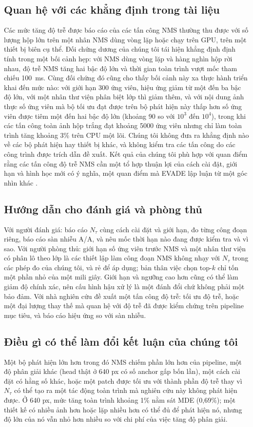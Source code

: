 \documentclass[a4paper,fleqn]{cas-dc}
\newcommand{\Ntau}{N_{\tau}}
\begin{document}
\subsection{Quan hệ với các khẳng định trong tài liệu}
Các mức tăng độ trễ được báo cáo của các tấn công NMS thường thu được với số lượng hộp lớn trên một nhân NMS dùng vòng lặp hoặc chạy trên GPU, trên một thiết bị biên cụ thể. Đối chứng dương của chúng tôi tái hiện khẳng định định tính trong một bối cảnh hẹp: với NMS dùng vòng lặp và hàng nghìn hộp rời nhau, độ trễ NMS tăng hai bậc độ lớn và thời gian toàn trình vượt mốc tham chiếu 100~ms. Cùng đối chứng đó cũng cho thấy bối cảnh này xa thực hành triển khai đến mức nào: với giới hạn 300 ứng viên, hiệu ứng giảm từ một đến ba bậc độ lớn, với một nhân thư viện phân biệt lớp thì giảm thêm, và với nội dung ảnh thực số ứng viên mà bộ tối ưu đạt được trên bộ phát hiện này thấp hơn số ứng viên được tiêm một đến hai bậc độ lớn (khoảng 90 so với $10^3$ đến $10^4$), trong khi các tấn công toàn ảnh hộp trắng đạt khoảng 5000 ứng viên nhưng chỉ làm toàn trình tăng khoảng 3\% trên CPU một lõi. Chúng tôi không đưa ra khẳng định nào về các bộ phát hiện hay thiết bị khác, và không kiểm tra các tấn công do các công trình được trích dẫn đề xuất. Kết quả của chúng tôi phù hợp với quan điểm rằng các tấn công độ trễ NMS cần một tổ hợp thuận lợi của cách cài đặt, giới hạn và hình học mới có ý nghĩa, một quan điểm mà EVADE lập luận từ một góc nhìn khác \cite{evade2025}.

\subsection{Hướng dẫn cho đánh giá và phòng thủ}
Với người đánh giá: báo cáo $\Ntau$ cùng cách cài đặt và giới hạn, đo từng công đoạn riêng, báo cáo sàn nhiễu A/A, và nêu mốc thời hạn nào đang được kiểm tra và vì sao. Với người phòng thủ: giới hạn số ứng viên trước NMS và một nhân thư viện có phân lô theo lớp là các thiết lập làm công đoạn NMS không nhạy với $\Ntau$ trong các phép đo của chúng tôi, và rẻ để áp dụng; bản thân việc chọn top-$k$ chỉ tốn một phần nhỏ của một mili giây. Giới hạn và ngưỡng cao hơn cũng có thể làm giảm độ chính xác, nên cấu hình hậu xử lý là một đánh đổi chứ không phải một bảo đảm. Với nhà nghiên cứu đề xuất một tấn công độ trễ: tối ưu độ trễ, hoặc một đại lượng thay thế mà quan hệ với độ trễ đã được kiểm chứng trên pipeline mục tiêu, và báo cáo hiệu ứng so với sàn nhiễu.

\subsection{Điều gì có thể làm đổi kết luận của chúng tôi}
Một bộ phát hiện lớn hơn trong đó NMS chiếm phần lớn hơn của pipeline, một độ phân giải khác (head thật ở 640 px có số anchor gấp bốn lần), một cách cài đặt có hằng số khác, hoặc một patch được tối ưu với thành phần độ trễ thay vì $\Ntau$ có thể tạo ra một tác động toàn trình mà nghiên cứu này không phát hiện được. Ở 640 px, mức tăng toàn trình khoảng 1\% nằm sát MDE (0,69\%); một thiết kế có nhiều ảnh hơn hoặc lặp nhiều hơn có thể đủ để phát hiện nó, nhưng độ lớn của nó vẫn nhỏ hơn nhiều so với chi phí của việc tăng độ phân giải.
\end{document}
